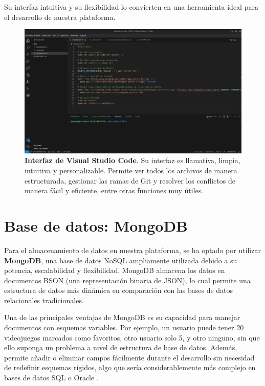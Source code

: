 Su interfaz intuitiva y su flexibilidad lo convierten en una herramienta ideal para el desarrollo de nuestra plataforma.

\begin{figure}[H]
     \centering
    \includegraphics[width=1\linewidth]{imagenes/vc.png}
     \caption[\textbf{Interfaz de Visual Studio Code}.]{\textbf{Interfaz de Visual Studio Code}. Su interfaz es llamativa, limpia, intuitiva y personalizable. Permite ver todos los archivos de manera estructurada, gestionar las ramas de Git y resolver los conflictos de manera fácil y eficiente, entre otras funciones muy útiles.}
     \label{fig:visualStudio-label}
 \end{figure}


\newpage

\section{Base de datos: MongoDB}

Para el almacenamiento de datos en nuestra plataforma, se ha optado por utilizar \textbf{MongoDB}, una base de datos NoSQL ampliamente utilizada debido a su potencia, escalabilidad y flexibilidad. MongoDB almacena los datos en documentos BSON (una representación binaria de JSON), lo cual permite una estructura de datos más dinámica en comparación con las bases de datos relacionales tradicionales.

Una de las principales ventajas de MongoDB es su capacidad para manejar documentos con esquemas variables. Por ejemplo, un usuario puede tener 20 videojuegos marcados como favoritos, otro usuario solo 5, y otro ninguno, sin que ello suponga un problema a nivel de estructura de base de datos. Además, permite añadir o eliminar campos fácilmente durante el desarrollo sin necesidad de redefinir esquemas rígidos, algo que sería considerablemente más complejo en bases de datos SQL o Oracle \cite{boicea2012mongodb} \cite{gyHorodi2015comparative}.

